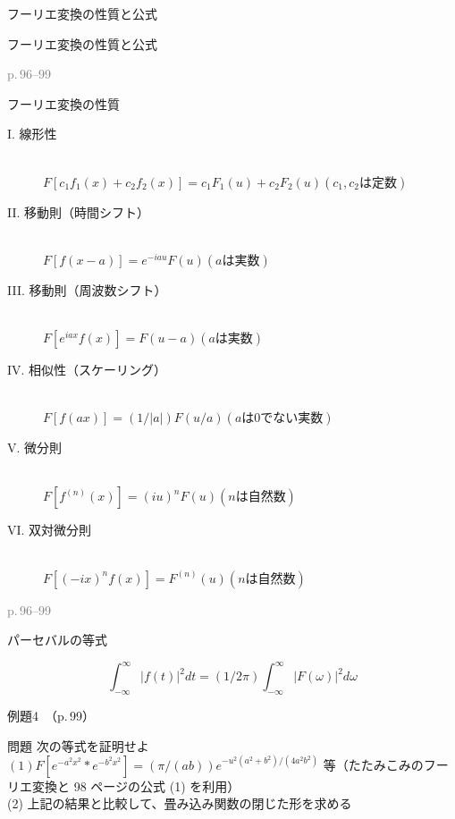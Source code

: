 \documentclass[aspectratio=43,professionalfonts,handout]{beamer}
\begin{document}
\begin{frame}{フーリエ変換の性質と公式}
  \begin{block}{}
  {\large フーリエ変換の性質と公式}
  \end{block}
  \vfill\hfill{\scriptsize \textcolor{gray}{p.\,96--99}}
\end{frame}

\begin{frame}{フーリエ変換の性質}
  \begin{block}{}
  \begin{description}
    \item[I. 線形性]\mbox{}\\$F[c_{1}f_{1}(x) + c_{2}f_{2}(x)] = c_{1}F_{1}(u) + c_{2}F_{2}(u)  (c_{1}, c_{2} は定数)$
    \item[II. 移動則（時間シフト）]\mbox{}\\$F[f(x-a)] = e^{-iau} F(u)  (a は実数)$
    \item[III. 移動則（周波数シフト）]\mbox{}\\$F[e^{iax}f(x)] = F(u-a)  (a は実数)$
    \item[IV. 相似性（スケーリング）]\mbox{}\\$F[f(ax)] = (1/|a|) F(u/a)  (a は 0 でない実数)$
    \item[V. 微分則]\mbox{}\\$F[f^{(n)}(x)] = (iu)^n F(u)  (n は自然数)$
    \item[VI. 双対微分則]\mbox{}\\$F[(-ix)^n f(x)] = F^{(n)}(u)  (n は自然数)$
  \end{description}
  \end{block}
  \vfill\hfill{\scriptsize \textcolor{gray}{p.\,96--99}}
\end{frame}

\begin{frame}{パーセバルの等式}
  \begin{block}{}
  \[
    \int_{-\infty}^\infty |f(t)|^{2} dt = (1/2\pi) \int_{-\infty}^\infty |F(\omega)|^{2} d\omega
  \]
  \end{block}
\end{frame}

\begin{frame}{例題4　（p.\,99）}
  \begin{exampleblock}{問題}
    次の等式を証明せよ\\[2pt]
    $(1) F[e^{-a^{2}x^{2}} * e^{-b^{2}x^{2}}] = (\pi/(ab)) e^{-u^{2}(a^{2}+b^{2})/(4a^{2}b^{2})}$ 等（たたみこみのフーリエ変換と 98 ページの公式 (1) を利用）\\[2pt]
    (2) 上記の結果と比較して、畳み込み関数の閉じた形を求める\\[2pt]
  \end{exampleblock}
\end{frame}
\end{document}
